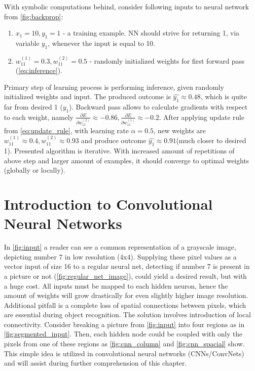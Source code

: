 \documentclass[11pt]{article}
\begin{document}
With symbolic computations behind, consider following inputs to neural network from \autoref{fig:backprop}:
\begin{enumerate}[1)]
\item $x_1=10, y_1=1$ - a training example. NN should strive for returning 1, via variable $y_1$, whenever the input is equal to 10.
\item $w_{11}^{(1)}=0.3, w_{11}^{(2)}=0.5$ - randomly initialized weights for first forward pass (\autoref{eq:inference}).
\end{enumerate}
Primary step of learning process is performing inference, given randomly initialized weights and input. The produced outcome is $\hat{y_1} \approx 0.48$, which is quite far from desired 1 ($y_1$). Backward pass allows to calculate gradients with respect to each weight, namely $\frac{\partial E}{\partial w_{11}^{(2)}} \approx -0.86,  \frac{\partial E}{\partial w_{11}^{(1)}} \approx -0.2$. After applying update rule from \autoref{eq:update_rule}, with learning rate $\alpha=0.5$, new weights are $w_{11}^{(1)} \approx 0.4, w_{11}^{(2)} \approx 0.93$ and produce outcome $\hat{y_1} \approx 0.91$(much closer to desired 1). Presented algorithm is iterative. With increased amount of repetitions of above step and larger amount of examples, it should converge to optimal weights (globally or locally).
\clearpage

\section{Introduction to Convolutional Neural Networks} \label{introduction_to_cnns}
In \autoref{fig:input} a reader can see a common representation of a grayscale image, depicting number 7 in low resolution (4x4). Supplying these pixel values as a vector input of size 16 to a regular neural net, detecting if number 7 is present in a picture or not (\autoref{fig:regular_net_image}), could yield a desired result, but with a huge cost. All inputs must be mapped to each hidden neuron, hence the amount of weights will grow drastically for even slightly higher image resolution. Additional pitfall is a complete loss of spatial connections between pixels, which are essential during object recognition. The solution involves introduction of local connectivity. Consider breaking a picture from \autoref{fig:input} into four regions as in \autoref{fig:segmented_input}. Then, each hidden node could be coupled with only the pixels from one of these regions as \autoref{fig:cnn_column} and \autoref{fig:cnn_spacial} show. This simple idea is utilized in convolutional neural networks (CNNs/ConvNets) and will assist during further comprehension of this chapter.
\end{document}
